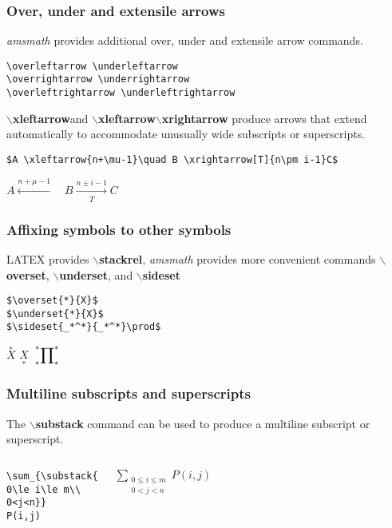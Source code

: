 \documentclass[12pt]{beamer}
\begin{document}
\begin{frame}[fragile]
\frametitle{Over, under and extensile arrows}
\emph{amsmath} provides additional over, under and extensile arrow commands.
\begin{verbatim}
\overleftarrow \underleftarrow
\overrightarrow \underrightarrow
\overleftrightarrow \underleftrightarrow
\end{verbatim}
$\backslash$\textbf{xleftarrow}and $\backslash$\textbf{xleftarrow}$\backslash$\textbf{xrightarrow} produce arrows that extend automatically to accommodate unusually wide subscripts or superscripts.
\tiny{\begin{verbatim}
$A \xleftarrow{n+\mu-1}\quad B \xrightarrow[T]{n\pm i-1}C$
\end{verbatim}}

\small{$A \xleftarrow{n+\mu-1}\quad B \xrightarrow[T]{n\pm i-1}C$}
\end{frame}

\begin{frame}[fragile]
\frametitle{Affixing symbols to other symbols}
LATEX provides $\backslash$\textbf{stackrel}, \emph{amsmath} provides more convenient commands $\backslash$\textbf{overset}, $\backslash$\textbf{underset}, and $\backslash$\textbf{sideset}
\begin{verbatim}
$\overset{*}{X}$
$\underset{*}{X}$
$\sideset{_*^*}{_*^*}\prod$
\end{verbatim}
$\overset{*}{X}$ \quad
$\underset{*}{X}$ \quad
$\sideset{_*^*}{_*^*}\prod$
\end{frame}

\begin{frame}[fragile]
\frametitle{Multiline subscripts and superscripts}
The $\backslash$\textbf{substack} command can be used to produce a multiline subscript or superscript.
    \begin{columns}
        \begin{block}{}
        \begin{verbatim}
\sum_{\substack{
0\le i\le m\\
0<j<n}}
P(i,j)
        \end{verbatim}
        \end{block}
        \begin{block}{}
        $\sum_{\substack{
        0\le i\le m\\
        0<j<n}}
        P(i,j)$
        \end{block}
    \end{columns}
\end{frame}
\end{document}
